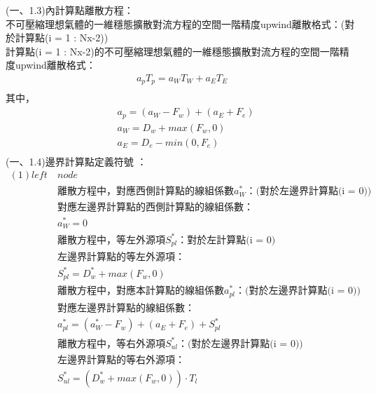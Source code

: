 \documentclass[12pt]{article}
\begin{document}
\noindent (一、1.3)內計算點離散方程：\\
不可壓縮理想氣體的一維穩態擴散對流方程的空間一階精度upwind離散格式：(對於計算點(i = 1 : Nx-2))\\
計算點(i = 1 : Nx-2)的不可壓縮理想氣體的一維穩態擴散對流方程的空間一階精度upwind離散格式：\\
\begin{equation}
\begin{split}
    a_{p}T_{p} = a_{W}T_{W} + a_{E}T_{E}\\
\end{split}
\end{equation}
\noindent 其中，
\begin{equation}
    \begin{split}
        &a_{p} = (a_{W} - F_{w}) + (a_{E} + F_{e})\\
        &a_{W} = D_{w} + max(F_{w},0)\\
        &a_{E} = D_{e} - min(0 , F_{e})\\
    \end{split}
\end{equation}
\noindent (一、1.4)邊界計算點定義符號 ：\\
\begin{equation}
    \begin{split}
        (1)left\ &node \\
        &\mbox{離散方程中，對應西側計算點的線組係數$a_{W}^{*}$：(對於左邊界計算點(i = 0))}\\    
        &\mbox{對應左邊界計算點的西側計算點的線組係數：}\\
        &a_{W}^{*} = 0\\
        &\mbox{離散方程中，等左外源項$S_{pl}^{*}$：對於左計算點(i = 0)}\\
        &\mbox{左邊界計算點的等左外源項：}\\
        &S_{pl}^{*} = D_{w}^{*} + max(F_{w},0) \\
        &\mbox{離散方程中，對應本計算點的線組係數$a_{pl}^{*}$：(對於左邊界計算點(i = 0))}\\    
        &\mbox{對應左邊界計算點的線組係數：}\\
        &a_{pl}^{*} = (a_{W}^{*}-F_{w}) + (a_{E} + F_{e}) + S_{pl}^{*} \\
        &\mbox{離散方程中，等右外源項$S_{ul}^{*}$：(對於左邊界計算點(i = 0))}\\
        &\mbox{左邊界計算點的等右外源項：}\\
        &S_{ul}^{*} = (D_{w}^{*}  + max( F_{w} , 0 ))\cdot T_{l}\\
\end{split}
\end{equation}
\end{document}
